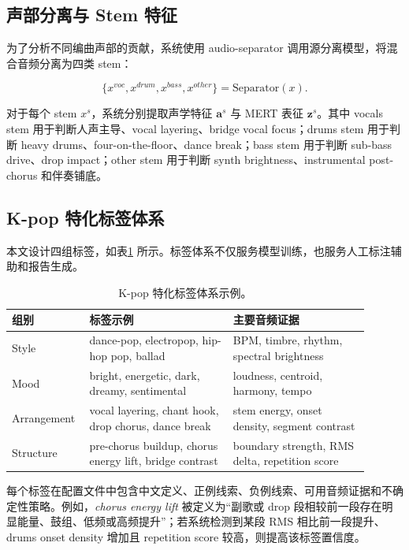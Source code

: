 \documentclass[UTF8,zihao=-4]{ctexart}
\begin{document}
\subsection{声部分离与 Stem 特征}

为了分析不同编曲声部的贡献，系统使用 audio-separator 调用源分离模型，将混合音频分离为四类 stem：

\begin{equation}
\{x^{voc},x^{drum},x^{bass},x^{other}\}=\mathrm{Separator}(x).
\end{equation}

对于每个 stem $x^s$，系统分别提取声学特征 $\bm{a}^s$ 与 MERT 表征 $\bm{z}^s$。其中 vocals stem 用于判断人声主导、vocal layering、bridge vocal focus；drums stem 用于判断 heavy drums、four-on-the-floor、dance break；bass stem 用于判断 sub-bass drive、drop impact；other stem 用于判断 synth brightness、instrumental post-chorus 和伴奏铺底。

\subsection{K-pop 特化标签体系}

本文设计四组标签，如表\ref{tab:taxonomy} 所示。标签体系不仅服务模型训练，也服务人工标注辅助和报告生成。

\begin{table}[H]
\centering
\caption{K-pop 特化标签体系示例。}
\label{tab:taxonomy}
\small
\begin{tabular}{p{0.16\linewidth}p{0.38\linewidth}p{0.36\linewidth}}
\toprule
组别 & 标签示例 & 主要音频证据 \\
\midrule
Style & dance-pop, electropop, hip-hop pop, ballad & BPM, timbre, rhythm, spectral brightness \\
Mood & bright, energetic, dark, dreamy, sentimental & loudness, centroid, harmony, tempo \\
Arrangement & vocal layering, chant hook, drop chorus, dance break & stem energy, onset density, segment contrast \\
Structure & pre-chorus buildup, chorus energy lift, bridge contrast & boundary strength, RMS delta, repetition score \\
\bottomrule
\end{tabular}
\end{table}

每个标签在配置文件中包含中文定义、正例线索、负例线索、可用音频证据和不确定性策略。例如，\textit{chorus energy lift} 被定义为“副歌或 drop 段相较前一段存在明显能量、鼓组、低频或高频提升”；若系统检测到某段 RMS 相比前一段提升、drums onset density 增加且 repetition score 较高，则提高该标签置信度。
\end{document}

